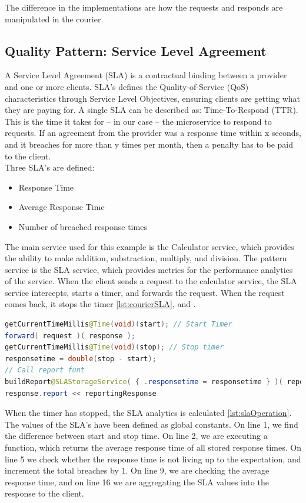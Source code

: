 \documentclass[12pt]{article}
\begin{document}
The difference in the implementations are how the requests and responds are manipulated in the courier.

\subsection{Quality Pattern: Service Level Agreement}
A Service Level Agreement (SLA) \cite{SLA:1} is a contractual binding between a provider and one or more clients. SLA's defines the Quality-of-Service (QoS) \cite{QoS:1} characteristics through Service Level Objectives, ensuring clients are getting what they are paying for. A single SLA can be described as: Time-To-Respond (TTR). This is the time it takes for -- in our case -- the microservice to respond to requests. If an agreement from the provider was a response time within x seconds, and it breaches for more than y times per month, then a penalty has to be paid to the client. \\

Three SLA's are defined:
\begin{itemize}
    \item Response Time
    \item Average Response Time
    \item Number of breached response times
\end{itemize}

The main service used for this example is the Calculator service, which provides the ability to make addition, substraction, multiply, and division. The pattern service is the SLA service, which provides metrics for the performance analytics of the service. When the client sends a request to the calculator service, the SLA service intercepts, starts a timer, and forwards the request. When the request comes back, it stops the timer \ref{lst:courierSLA}, and . 

\begin{lstlisting}[caption=Courier operations for the SLA service, 
captionpos=b, language=java, label=courierSLA, frame=single, breaklines=true]
getCurrentTimeMillis@Time(void)(start); // Start Timer
forward( request )( response );
getCurrentTimeMillis@Time(void)(stop); // Stop timer
responsetime = double(stop - start);
// Call report funt
buildReport@SLAStorageService( { .responsetime = responsetime } )( reportingResponse );
response.report << reportingResponse
\end{lstlisting}

When the timer has stopped, the SLA analytics is calculated \ref{lst:slaOperation}. The values of the SLA's have been defined as global constants. On line 1, we find the difference between start and stop time. On line 2, we are executing a function, which returns the average response time of all stored response times. On line 5 we check whether the response time is not living up to the expectation, and increment the total breaches by 1. On line 9, we are checking the average response time, and on line 16 we are aggregating the SLA values into the response to the client. 
\end{document}
